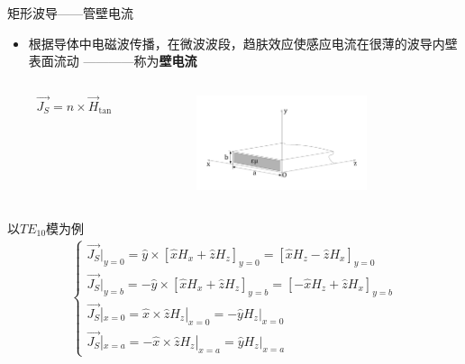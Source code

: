 \begin{frame}{矩形波导——管壁电流}
    \begin{itemize}
        \item 根据导体中电磁波传播，在微波波段，趋肤效应使感应电流在很薄的波导内壁表面流动  ————称为\textbf{壁电流}
    \end{itemize}
    \begin{columns}
        \begin{column}{0.5\linewidth}
            $$\vec{J_S}=\hat{n}\times\vec{H}_{\tan}$$
        \end{column}
        \begin{column}{0.5\linewidth}
            \begin{figure}
                \includegraphics[width=5cm]{Cha6//fig6-3.pdf}
            \end{figure}
        \end{column}
    \end{columns}
    以$TE_{10}$模为例
    \begin{align*}
        \begin{cases}
            \vec{J_S}|_{y=0}=\hat{y}\times[\hat{x}H_x+\hat{z}H_z]_{y=0}=[\hat{x}H_z-\hat{z}H_x]_{y=0}   \\
            \vec{J_S}|_{y=b}=-\hat{y}\times[\hat{x}H_x+\hat{z}H_z]_{y=b}=[-\hat{x}H_z+\hat{z}H_x]_{y=b} \\
            \vec{J_S}|_{x=0}=\hat{x}\times\hat{z}H_z|_{x=0}=-\hat{y}H_z|_{x=0}                          \\
            \vec{J_S}|_{x=a}=-\hat{x}\times\hat{z}H_z|_{x=a}=\hat{y}H_z|_{x=a}
        \end{cases}
    \end{align*}
\end{frame}

